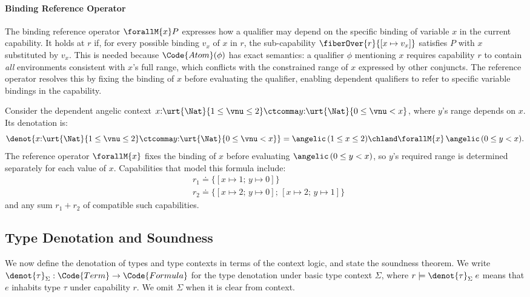 \paragraph{Binding Reference Operator}
The binding reference operator $\forallM{x} P$ expresses how a
qualifier may depend on the specific binding of variable $x$ in the
current capability.  It holds at $r$ if, for every possible binding $v_x$
of $x$ in $r$, the sub-capability $\fiberOver{r}{[x \mapsto v_x]}$
satisfies $P$ with $x$ substituted by $v_x$.  This is needed because
$\Code{Atom}(\phi)$ has exact semantics: a qualifier $\phi$ mentioning
$x$ requires capability $r$ to contain \emph{all} environments
consistent with $x$'s full range, which conflicts with the constrained
range of $x$ expressed by other conjuncts.  The reference operator
resolves this by fixing the binding of $x$ before evaluating the
qualifier, enabling dependent qualifiers to refer to specific variable
bindings in the capability.

\begin{example}\label{ex-variable-reference}
  Consider the dependent angelic context $x{:}\urt{\Nat}{1 \leq \vnu
    \leq 2} \ctcomma y{:}\urt{\Nat}{0 \leq \vnu < x}$, where $y$'s
  range depends on $x$.  Its denotation is:
  \[
    \denot{x{:}\urt{\Nat}{1 \leq \vnu \leq 2} \ctcomma y{:}\urt{\Nat}{0 \leq \vnu < x}}
    = \angelic\,(1 \leq x \leq 2) \chland \forallM{x}\,\angelic\,(0 \leq y < x).
  \]
  The reference operator $\forallM{x}$ fixes the binding of $x$ before
  evaluating $\angelic\,(0 \leq y < x)$, so $y$'s required range is
  determined separately for each value of $x$.  Capabilities that
  model this formula include:
  \begin{align*}
    &r_1 \doteq \{[x \mapsto 1;\, y \mapsto 0]\} \\
    &r_2 \doteq \{[x \mapsto 2;\, y \mapsto 0];\, [x \mapsto 2;\, y \mapsto 1]\}
  \end{align*}
  and any sum $r_1 + r_2$ of compatible such capabilities.
\end{example}

\subsection{Type Denotation and Soundness}\label{subsec:denotation}

We now define the denotation of types and type contexts in terms of
the context logic, and state the soundness theorem.  We write
$\denot{\tau}_\Sigma : \Code{Term} \to \Code{Formula}$ for the type
denotation under basic type context $\Sigma$, where $r \models
\denot{\tau}_\Sigma\;e$ means that $e$ inhabits type $\tau$ under
capability $r$.  We omit $\Sigma$ when it is clear from context.

